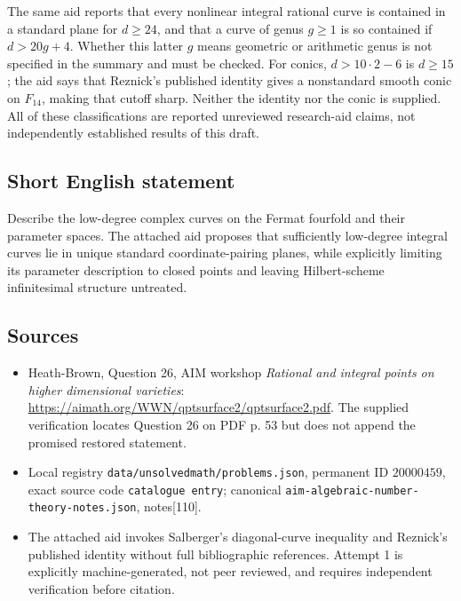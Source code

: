 \documentclass[11pt]{article}
\begin{document}
The same aid reports that every nonlinear integral rational curve is contained in a standard plane for \(d\geq24\), and that a curve of genus \(g\geq1\) is so contained if \(d>20g+4\). Whether this latter \(g\) means geometric or arithmetic genus is not specified in the summary and must be checked. For conics, \(d>10\cdot2-6\) is \(d\geq15\); the aid says that Reznick's published identity gives a nonstandard smooth conic on \(F_{14}\), making that cutoff sharp. Neither the identity nor the conic is supplied. All of these classifications are reported unreviewed research-aid claims, not independently established results of this draft.
\subsection{Short English statement}
Describe the low-degree complex curves on the Fermat fourfold and their parameter spaces. The attached aid proposes that sufficiently low-degree integral curves lie in unique standard coordinate-pairing planes, while explicitly limiting its parameter description to closed points and leaving Hilbert-scheme infinitesimal structure untreated.
\subsection{Sources}
\begin{itemize}
\item Heath-Brown, Question 26, AIM workshop \emph{Rational and integral points on higher dimensional varieties}: \url{https://aimath.org/WWN/qptsurface2/qptsurface2.pdf}. The supplied verification locates Question 26 on PDF p. 53 but does not append the promised restored statement.
\item Local registry \texttt{data/unsolvedmath/problems.json}, permanent ID \(20000459\), exact source code \texttt{catalogue entry}; canonical \texttt{aim-algebraic-number-theory-notes.json}, notes[110].
\item The attached aid invokes Salberger's diagonal-curve inequality and Reznick's published identity without full bibliographic references. Attempt 1 is explicitly machine-generated, not peer reviewed, and requires independent verification before citation.
\end{itemize}
\end{document}
